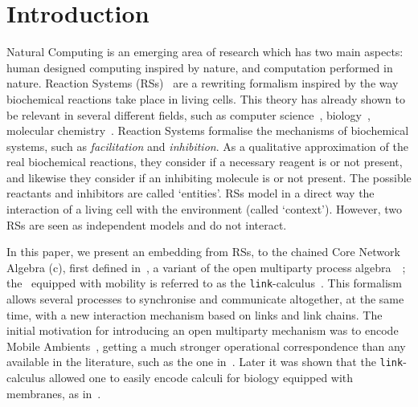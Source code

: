 
\section{Introduction}

Natural Computing is an emerging area of research which has two main 
aspects: human designed computing inspired by nature, and computation 
performed in nature. Reaction Systems (RSs)~\cite{BEMR11} are 
a rewriting formalism
inspired by the way biochemical reactions take place in living 
cells.  
This theory has already shown to be relevant in several different 
fields, such as computer science~\cite{MPR15}, 
biology~\cite{ABP14,CMMBM12,Az17,BarbutiGLM16}, 
molecular chemistry~\cite{OY16}.
Reaction Systems formalise the mechanisms of biochemical systems, 
such as {\em facilitation} and {\em inhibition}. 
As a qualitative approximation of the real biochemical reactions, they
consider if a necessary reagent is or not present, and likewise they
consider if an inhibiting molecule is or not present. 
The  possible reactants and inhibitors are called `entities'.
RSs model in a direct way the interaction of a living cell
with the environment (called `context'). However, two RSs are seen
as independent models and do not interact.


{\color{red}In this paper, we present an embedding
from RSs, 
to the chained Core Network  Algebra (c\CNA), first defined in~\cite{BBF19}, a variant of the 
 open multiparty process algebra~\CNA~\cite{BBB17}; the \CNA~equipped with mobility is referred to as the {\tt link}-calculus~\cite{BODEI2020104587}}.
This formalism allows several processes to synchronise and 
communicate altogether, at the same time, with a new interaction
mechanism based on links and link chains. 
The initial motivation for introducing
{\color{red} an open multiparty mechanism}
was to encode
Mobile Ambients~\cite{CardelliG00}, getting a much stronger operational
correspondence than any available in the literature, such as the one in~\cite{B16}.
Later it was shown that the {\tt link}-calculus allowed one to easily encode calculi for biology equipped with membranes, as in~\cite{BodeiBBC14}.

